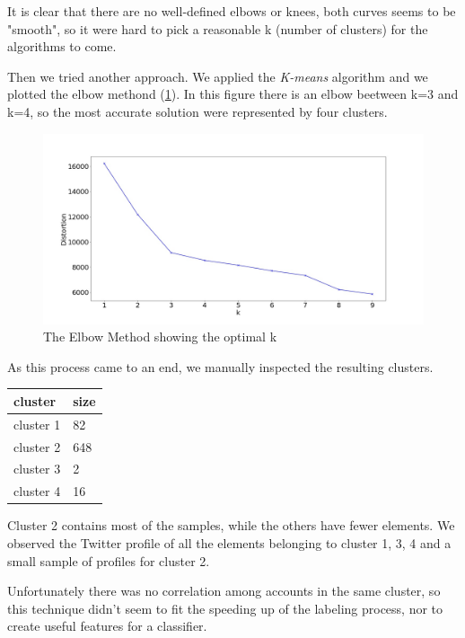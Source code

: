 It is clear that there are no well-defined elbows or knees, both curves seems to be "smooth", so it were hard to pick a reasonable k (number of clusters) for the algorithms to come.

Then we tried another approach. We applied the \emph{K-means} algorithm and we plotted the elbow methond (\ref{fig:elbow}). In this figure there is an elbow beetween k=3 and k=4, so the most accurate solution were represented by four clusters.

\begin{figure}
	\includegraphics[width=\linewidth]{chapter3/figure/elbow.jpg}
	\caption{The Elbow Method showing the optimal k}
	\label{fig:elbow}
\end{figure}

As this process came to an end, we manually inspected the resulting clusters.

\begin{center}
	\begin{tabular}{ll}
	\\cluster&size\\
	\hline\hline
	cluster 1&82\\
	cluster 2&648\\
	cluster 3&2\\
	cluster 4&16\\\hline
	\end{tabular}
\end{center}

Cluster 2 contains most of the samples, while the others have fewer elements.
We observed the Twitter profile of all the elements belonging to cluster 1, 3, 4 and a small sample of profiles for cluster 2.

Unfortunately there was no correlation among accounts in the same cluster, so this technique didn't seem to fit the speeding up of the labeling process, nor to create useful features for a classifier.

